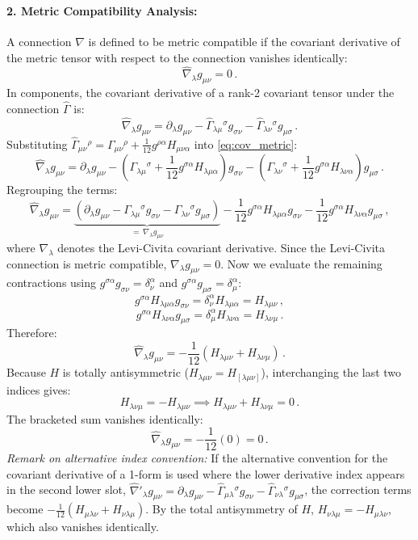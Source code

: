 \documentclass[12pt]{article}
\newcommand{\be}{\begin{equation}}
\newcommand{\ee}{\end{equation}}
\begin{document}
\paragraph{2. Metric Compatibility Analysis:}
A connection $\hat\nabla$ is defined to be metric compatible if the covariant derivative of the metric tensor with respect to the connection vanishes identically:
\be
\hat\nabla_\lambda g_{\mu\nu} = 0 \,.
\ee
In components, the covariant derivative of a rank-2 covariant tensor under the connection $\hat\Gamma$ is:
\be
\hat\nabla_\lambda g_{\mu\nu} = \partial_\lambda g_{\mu\nu} - \hat\Gamma_{\lambda\mu}{}^\sigma g_{\sigma\nu} - \hat\Gamma_{\lambda\nu}{}^\sigma g_{\mu\sigma} \,.
\label{eq:cov_metric}
\ee
Substituting $\hat\Gamma_{\mu\nu}{}^\rho = \Gamma_{\mu\nu}{}^\rho + \frac{1}{12} g^{\rho\alpha} H_{\mu\nu\alpha}$ into \eqref{eq:cov_metric}:
\be
\hat\nabla_\lambda g_{\mu\nu} = \partial_\lambda g_{\mu\nu} - \left( \Gamma_{\lambda\mu}{}^\sigma + \frac{1}{12} g^{\sigma\alpha} H_{\lambda\mu\alpha} \right) g_{\sigma\nu} - \left( \Gamma_{\lambda\nu}{}^\sigma + \frac{1}{12} g^{\sigma\alpha} H_{\lambda\nu\alpha} \right) g_{\mu\sigma} \,.
\ee
Regrouping the terms:
\be
\hat\nabla_\lambda g_{\mu\nu} = \underbrace{\left( \partial_\lambda g_{\mu\nu} - \Gamma_{\lambda\mu}{}^\sigma g_{\sigma\nu} - \Gamma_{\lambda\nu}{}^\sigma g_{\mu\sigma} \right)}_{=\, \nabla_\lambda g_{\mu\nu}} - \frac{1}{12} g^{\sigma\alpha} H_{\lambda\mu\alpha} g_{\sigma\nu} - \frac{1}{12} g^{\sigma\alpha} H_{\lambda\nu\alpha} g_{\mu\sigma} \,,
\ee
where $\nabla_\lambda$ denotes the Levi-Civita covariant derivative.
Since the Levi-Civita connection is metric compatible, $\nabla_\lambda g_{\mu\nu} = 0$.
Now we evaluate the remaining contractions using $g^{\sigma\alpha} g_{\sigma\nu} = \delta^\alpha_\nu$ and $g^{\sigma\alpha} g_{\mu\sigma} = \delta^\alpha_\mu$:
\be
g^{\sigma\alpha} H_{\lambda\mu\alpha} g_{\sigma\nu} = \delta^\alpha_\nu H_{\lambda\mu\alpha} = H_{\lambda\mu\nu} \,,
\ee
\be
g^{\sigma\alpha} H_{\lambda\nu\alpha} g_{\mu\sigma} = \delta^\alpha_\mu H_{\lambda\nu\alpha} = H_{\lambda\nu\mu} \,.
\ee
Therefore:
\be
\hat\nabla_\lambda g_{\mu\nu} = - \frac{1}{12} \left( H_{\lambda\mu\nu} + H_{\lambda\nu\mu} \right) \,.
\ee
Because $H$ is totally antisymmetric ($H_{\lambda\mu\nu} = H_{[\lambda\mu\nu]}$), interchanging the last two indices gives:
\be
H_{\lambda\nu\mu} = - H_{\lambda\mu\nu} \implies H_{\lambda\mu\nu} + H_{\lambda\nu\mu} = 0 \,.
\ee
The bracketed sum vanishes identically:
\be
\hat\nabla_\lambda g_{\mu\nu} = - \frac{1}{12} (0) = 0 \,.
\ee
\emph{Remark on alternative index convention:} If the alternative convention for the covariant derivative of a 1-form is used where the lower derivative index appears in the second lower slot, $\hat\nabla'_\lambda g_{\mu\nu} = \partial_\lambda g_{\mu\nu} - \hat\Gamma_{\mu\lambda}{}^\sigma g_{\sigma\nu} - \hat\Gamma_{\nu\lambda}{}^\sigma g_{\mu\sigma}$, the correction terms become $- \frac{1}{12}(H_{\mu\lambda\nu} + H_{\nu\lambda\mu})$. By the total antisymmetry of $H$, $H_{\nu\lambda\mu} = - H_{\mu\lambda\nu}$, which also vanishes identically.
\end{document}
